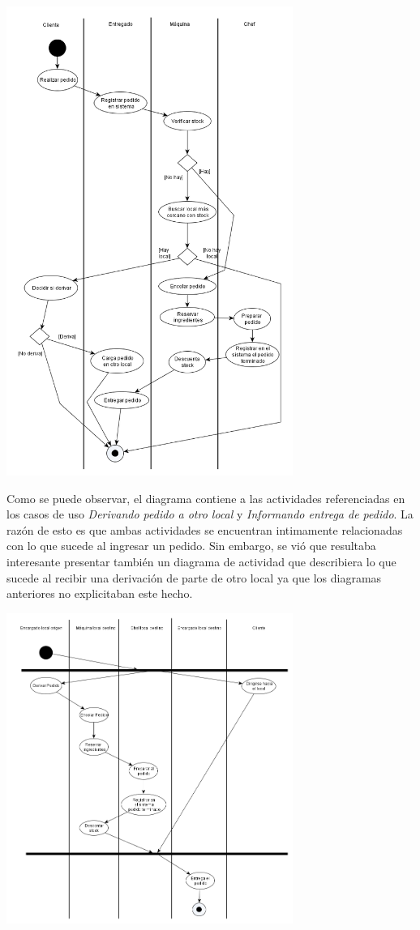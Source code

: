 \documentclass[a4paper,11pt] {article}
\begin{document}
\begin{center}
 \includegraphics[width=0.7\textwidth]{Diagramas/DiagramaActividadPedidoLocal.png}
\end{center}

Como se puede observar, el diagrama contiene a las actividades referenciadas en los casos de uso \textit{Derivando pedido a otro local} y \textit{Informando entrega de pedido}. La raz\'on de esto es que ambas actividades se encuentran intimamente relacionadas con lo que sucede al ingresar un pedido. Sin embargo, se vi\'o que resultaba interesante presentar tambi\'en un diagrama de actividad que describiera lo que sucede al recibir una derivaci\'on de parte de otro local ya que los diagramas anteriores no explicitaban este hecho.

\begin{center}
 \includegraphics[width=0.7\textwidth]{Diagramas/DiagramaActividadPedidoExterno.png}
\end{center}
\end{document}
